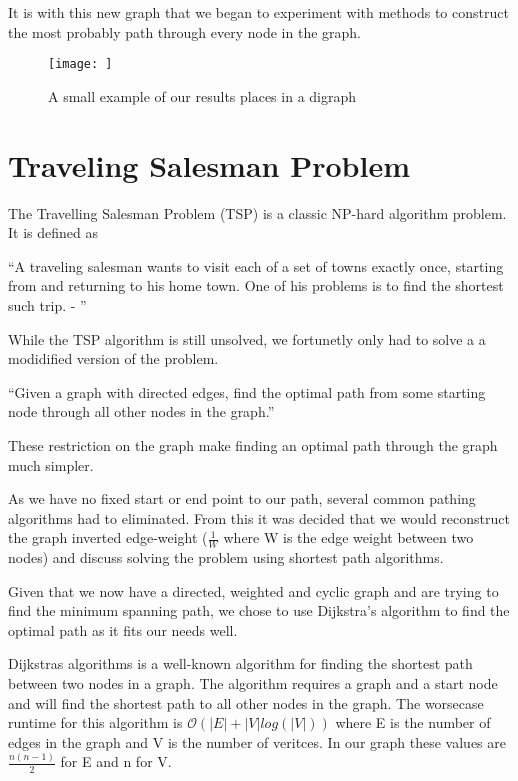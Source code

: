 \documentclass[bsc,frontabs,twoside,singlespacing,parskip,deptreport]{infthesis}     %
\begin{document}
It is with this new graph that we began to experiment with methods to construct the most probably path through every
node in the graph.


\begin{figure}
  \centering
  \texttt{[image: ]}
  \caption{A small example of our results places in a digraph}
  \label{fig:digraph}
  \end{figure}

\section{Traveling Salesman Problem}
The Travelling Salesman Problem (TSP) is a classic NP-hard algorithm problem\cite{junger1995traveling}.%
It is defined as\\
\begin{center}
\enquote{A traveling salesman wants to visit each of a set of towns exactly once, starting
from and returning to his home town. One of his problems is to find the shortest
such trip. - \cite{junger1995traveling}}
\end{center}

While the TSP algorithm is still unsolved, we fortunetly only had to solve a a modidified version of the problem.\\

\begin{center}
  \enquote{Given a graph with directed edges, find the optimal path from some starting node through all other nodes in
  the graph.}
\end{center}

These restriction on the graph make finding an optimal path through the graph much simpler.

As we have no fixed start or end point to our path, several common pathing algorithms had to eliminated.
From this it was decided that we would reconstruct the graph inverted edge-weight ($\frac{1}{W}$ where W is the edge weight
between two nodes) and discuss solving the problem using shortest path algorithms.


Given that we now have a directed, weighted and cyclic graph and are trying to find the minimum spanning path,
we chose to use Dijkstra's algorithm to find the optimal path as it fits our needs well.

Dijkstras algorithms is a well-known algorithm for finding the shortest path between two nodes in a graph.
The algorithm requires a graph and a start node and will find the shortest path to all other nodes in the graph.
The worsecase runtime for this algorithm is $\mathcal{O}(|E| + |V|log(|V|))$ where E is the number of edges in the graph and V
is the number of veritces.
In our graph these values are $\frac{n(n-1)}{2}$ for E and n for V.
\end{document}

